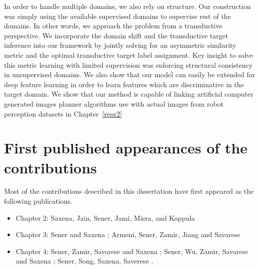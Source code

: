 In order to handle multiple domains, we also rely on structure. Our construction was simply using the available supervised domains to supervise rest of the domains. In other words, we approach the problem from a transductive perspective. We incorporate the domain shift and the transductive target inference into our framework by jointly solving for an asymmetric similarity metric and the optimal transductive target label assignment. Key insight to solve this metric learning with limited supervision was enforcing structural consistency in unsupervised domains. We also show that our model can easily be extended for deep feature learning in order to learn features which are discriminative in the target domain. We show that our method is capable of linking artificial computer generated images planner algorithms use with actual images from robot perception datasets in Chapter~\ref{repr2}

\section{First published appearances of the contributions}

Most of the contributions described in this dissertation have first appeared as the following publications.
\begin{itemize}
\item Chapter 2: Saxena, Jain, Sener, Jami, Misra, and Koppula \cite{robobrain}
\item Chapter 3: Sener and Saxena \cite{rcrf}; Armeni, Sener, Zamir, Jiang and Savarese \cite{cvpr_iro}
\item Chapter 4: Sener, Zamir, Savarese and Saxena \cite{iccv_ozan}; Sener, Wu, Zamir, Savarese and Saxena \cite{ijcv_ozan}; Sener, Song, Saxena, Saverese \cite{da_ozan}.
\end{itemize}
